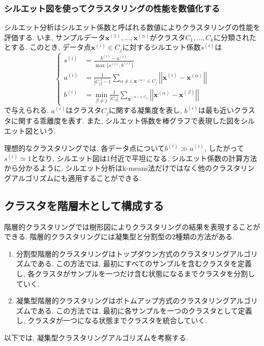 \documentclass[uplatex]{jsarticle}
\theoremstyle{definition}
\numberwithin{equation}{section}
\newcommand{\norm}[1]{\left|\left|#1\right|\right|}
\begin{document}
\subsubsection{シルエット図を使ってクラスタリングの性能を数値化する}
シルエット分析はシルエット係数と呼ばれる数値によりクラスタリングの性能を評価する.
いま, サンプルデータ$\bm{x}^{(1)}, \dots, \bm{x}^{(n)}$がクラスタ$C_{1}, \dots, C_{k}$に分類されたとする.
このとき, データ点$\bm{x}^{(i)} \in C_{j}$に対するシルエット係数$s^{(i)}$は
\begin{equation}
    \left\{
    \begin{aligned}
        s^{(i)} &= \frac{b^{(i)} - a^{(i)}}{\max\{a^{(i)}, b^{(i)}\}} \\
        a^{(i)} &= \frac{1}{|C_{j}| - 1} \sum_{\alpha \neq i, \bm{x}^{(\alpha)} \in C_{j}} \norm{\bm{x}^{(i)} - \bm{x}^{(\alpha)}} \\
        b^{(i)} &= \min_{\beta \neq j} \frac{1}{|C_{\beta}|}\sum_{\bm{x}^{(\alpha) \in C_{\beta}}} \norm{\bm{x}^{(\alpha)} - \bm{x}^{(\beta)}}
    \end{aligned}
    \right.
\end{equation}
で与えられる.
$a^{(i)}$はクラスタ$C_{j}$に関する凝集度を表し, $b^{(i)}$は最も近いクラスタに関する乖離度を表す.
また, シルエット係数を棒グラフで表現した図をシルエット図という.

理想的なクラスタリングでは, 各データ点について$b^{(i)} \gg a^{(i)}$, したがって$s^{(i)} \simeq 1$となり, シルエット図は1付近で平坦になる.
シルエット係数の計算方法から分かるように, シルエット分析はk-means法だけではなく他のクラスタリングアルゴリズムにも適用することができる.


\subsection{クラスタを階層木として構成する}
階層的クラスタリングでは樹形図によりクラスタリングの結果を表現することができる.
階層的クラスタリングには凝集型と分割型の2種類の方法がある.
\begin{enumerate}
    \item
    分割型階層的クラスタリングはトップダウン方式のクラスタリングアルゴリズムである.
    この方法では, 最初にすべてのサンプルを含むクラスタを定義し, 各クラスタがサンプルを一つだけ含む状態になるまでクラスタを分割していく.

    \item
    凝集型階層的クラスタリングはボトムアップ方式のクラスタリングアルゴリズムである.
    この方法では, 最初に各サンプルを一つのクラスタとして定義し, クラスタが一つになる状態までクラスタを統合していく.
\end{enumerate}
以下では, 凝集型クラスタリングアルゴリズムを考察する.
\end{document}
